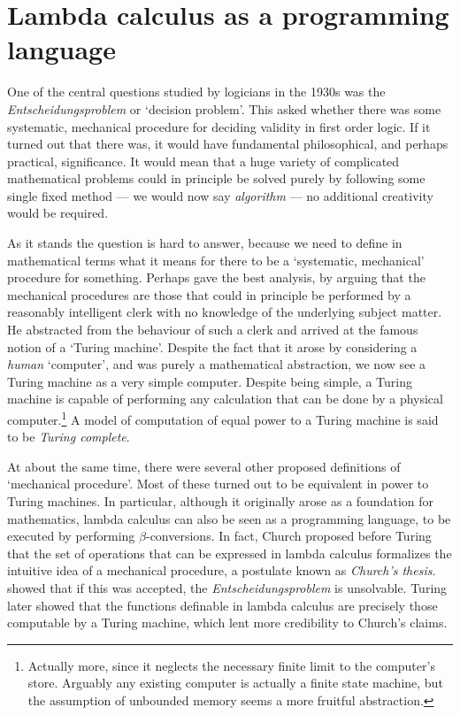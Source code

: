 \chapter{Lambda calculus as a programming language}

One of the central questions studied by logicians in the 1930s was the {\em
Entscheidungsproblem} or `decision problem'. This asked whether there was some
systematic, mechanical procedure for deciding validity in first order logic. If
it turned out that there was, it would have fundamental philosophical, and
perhaps practical, significance. It would mean that a huge variety of
complicated mathematical problems could in principle be solved purely by
following some single fixed method --- we would now say {\em algorithm} --- no
additional creativity would be required.

As it stands the question is hard to answer, because we need to define in
mathematical terms what it means for there to be a `systematic, mechanical'
procedure for something. Perhaps  gave the best analysis, by
arguing that the mechanical procedures are those that could in principle be
performed by a reasonably intelligent clerk with no knowledge of the underlying
subject matter. He abstracted from the behaviour of such a clerk and arrived at
the famous notion of a `Turing machine'. Despite the fact that it arose by
considering a {\em human} `computer', and was purely a mathematical
abstraction, we now see a Turing machine as a very simple computer. Despite
being simple, a Turing machine is capable of performing any calculation that
can be done by a physical computer.\footnote{Actually more, since it neglects
the necessary finite limit to the computer's store. Arguably any existing
computer is actually a finite state machine, but the assumption of unbounded
memory seems a more fruitful abstraction.} A model of computation of equal
power to a Turing machine is said to be {\em Turing complete}.

At about the same time, there were several other proposed definitions of
`mechanical procedure'. Most of these turned out to be equivalent in power to
Turing machines. In particular, although it originally arose as a foundation
for mathematics, lambda calculus can also be seen as a programming language, to
be executed by performing $\beta$-conversions. In fact, Church proposed before
Turing that the set of operations that can be expressed in lambda calculus
formalizes the intuitive idea of a mechanical procedure, a postulate known as
{\em Church's thesis}.  showed that if this was accepted,
the {\em Entscheidungsproblem} is unsolvable. Turing later showed that the
functions definable in lambda calculus are precisely those computable by a
Turing machine, which lent more credibility to Church's claims.

